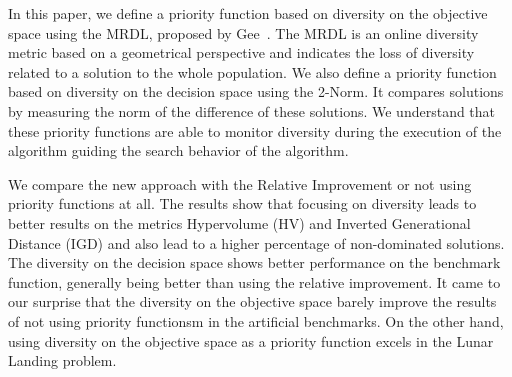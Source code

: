 In this paper, we define a priority function based on diversity on the objective space using the MRDL, proposed by Gee~\cite{gee2015online}. The MRDL is an online diversity metric based on a geometrical perspective and indicates the loss of diversity related to a solution to the whole population. We also define a priority function based on diversity on the decision space using the 2-Norm. It compares solutions by measuring the norm of  the difference of these solutions. We understand that these priority functions are able to monitor diversity during the execution of the algorithm guiding the search behavior of the algorithm.


We compare the new approach with the Relative Improvement or not using priority functions at all. The results show that focusing on diversity leads to better results on the metrics Hypervolume (HV) and Inverted Generational Distance (IGD) and also lead to a higher percentage of non-dominated solutions. The diversity on the decision space shows better performance on the benchmark function,  generally being better than using the relative improvement. It came to our surprise that the diversity on the objective space barely improve the results of not using priority functionsm in the artificial benchmarks. On the other hand, using diversity on the objective space as a priority function excels in the Lunar Landing problem.



